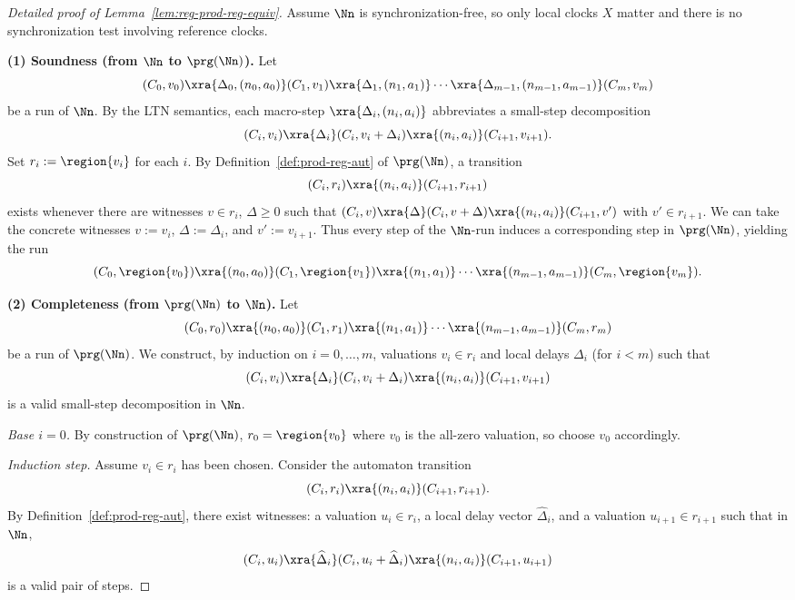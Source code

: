 \begin{proof}[Detailed proof of Lemma~\ref{lem:reg-prod-reg-equiv}]
Assume $\Nn$ is synchronization-free, so only local clocks $X$ matter and there
is no synchronization test involving reference clocks.

\medskip\noindent
\textbf{(1) Soundness (from $\Nn$ to $\prg(\Nn)$).}
Let
\[
(C_0,v_0)\xra{\Delta_0,(n_0,a_0)}(C_1,v_1)\xra{\Delta_1,(n_1,a_1)}\cdots
\xra{\Delta_{m-1},(n_{m-1},a_{m-1})}(C_m,v_m)
\]
be a run of $\Nn$.
By the LTN semantics, each macro-step
$\xra{\Delta_i,(n_i,a_i)}$ abbreviates a small-step decomposition
\[
(C_i,v_i)\xra{\Delta_i}(C_i,v_i+\Delta_i)\xra{(n_i,a_i)}(C_{i+1},v_{i+1}).
\]
Set $r_i:=\region{v_i}$ for each $i$.
By Definition~\ref{def:prod-reg-aut} of $\prg(\Nn)$, a transition
\[
(C_i,r_i)\xra{(n_i,a_i)}(C_{i+1},r_{i+1})
\]
exists whenever there are witnesses $v\in r_i$, $\Delta\ge 0$ such that
$(C_i,v)\xra{\Delta}(C_i,v+\Delta)\xra{(n_i,a_i)}(C_{i+1},v')$ with $v'\in r_{i+1}$.
We can take the concrete witnesses $v:=v_i$, $\Delta:=\Delta_i$, and $v':=v_{i+1}$.
Thus every step of the $\Nn$-run induces a corresponding step in $\prg(\Nn)$,
yielding the run
\[
(C_0,\region{v_0})\xra{(n_0,a_0)}(C_1,\region{v_1})\xra{(n_1,a_1)}\cdots
\xra{(n_{m-1},a_{m-1})}(C_m,\region{v_m}).
\]

\medskip\noindent
\textbf{(2) Completeness (from $\prg(\Nn)$ to $\Nn$).}
Let
\[
(C_0,r_0)\xra{(n_0,a_0)}(C_1,r_1)\xra{(n_1,a_1)}\cdots
\xra{(n_{m-1},a_{m-1})}(C_m,r_m)
\]
be a run of $\prg(\Nn)$.
We construct, by induction on $i=0,\dots,m$, valuations $v_i\in r_i$ and local
delays $\Delta_i$ (for $i<m$) such that
\[
(C_i,v_i)\xra{\Delta_i}(C_i,v_i+\Delta_i)\xra{(n_i,a_i)}(C_{i+1},v_{i+1})
\]
is a valid small-step decomposition in $\Nn$.

\smallskip\noindent
\emph{Base $i=0$.}
By construction of $\prg(\Nn)$, $r_0=\region{v_0}$ where $v_0$ is the all-zero
valuation, so choose $v_0$ accordingly.

\smallskip\noindent
\emph{Induction step.}
Assume $v_i\in r_i$ has been chosen.
Consider the automaton transition
\[
(C_i,r_i)\xra{(n_i,a_i)}(C_{i+1},r_{i+1}).
\]
By Definition~\ref{def:prod-reg-aut}, there exist witnesses:
a valuation $u_i\in r_i$, a local delay vector $\widehat{\Delta}_i$, and a
valuation $u_{i+1}\in r_{i+1}$ such that in $\Nn$,
\[
(C_i,u_i)\xra{\widehat{\Delta}_i}(C_i,u_i+\widehat{\Delta}_i)\xra{(n_i,a_i)}(C_{i+1},u_{i+1})
\]
is a valid pair of steps.


\end{proof}
